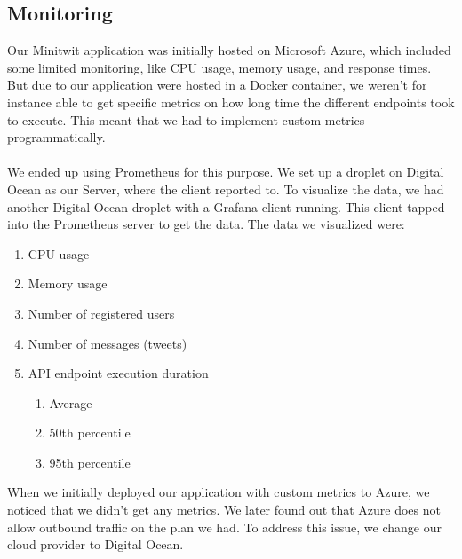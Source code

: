 \subsection{Monitoring}
Our Minitwit application was initially hosted on Microsoft Azure, which included some limited monitoring, like CPU usage, memory usage, and response times. But due to our application were hosted in a Docker container, we weren’t for instance able to get specific metrics on how long time the different endpoints took to execute. This meant that we had to implement custom metrics programmatically.
\\\\
We ended up using Prometheus for this purpose. We set up a droplet on Digital Ocean as our Server, where the client reported to. To visualize the data, we had another Digital Ocean droplet with a Grafana client running. This client tapped into the Prometheus server to get the data. The data we visualized were:
\begin{enumerate}
    \item CPU usage
    \item Memory usage
    \item Number of registered users
    \item Number of messages (tweets)
    \item API endpoint execution duration
    \begin{enumerate}
        \item Average
        \item 50th percentile
        \item 95th percentile
    \end{enumerate}
\end{enumerate}
When we initially deployed our application with custom metrics to Azure, we noticed that we didn’t get any metrics. We later found out that Azure does not allow outbound traffic on the plan we had. To address this issue, we change our cloud provider to Digital Ocean.
